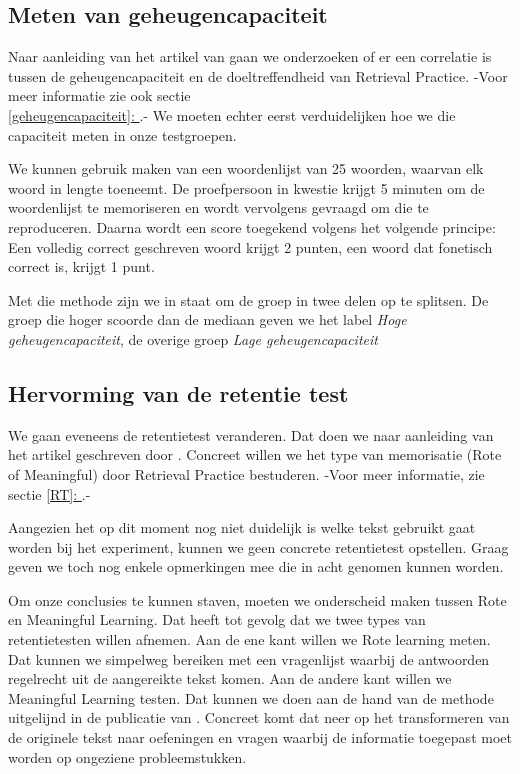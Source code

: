 \documentclass{hogent-article}
\newcommand{\customref}[1]{\underline{\ref{#1}: \nameref{#1}}}
\begin{document}
\subsection{Meten van geheugencapaciteit}
\label{methodology-gc}
Naar aanleiding van het artikel van \textcite{Agarwal_2016} gaan we onderzoeken of er een correlatie is tussen de geheugencapaciteit en de doeltreffendheid van Retrieval Practice. -Voor meer informatie zie ook sectie \\\customref{geheugencapaciteit}.- We moeten echter eerst verduidelijken hoe we die capaciteit meten in onze testgroepen.\\
\par
\noindent
We kunnen gebruik maken van een woordenlijst van 25 woorden, waarvan elk woord in lengte toeneemt. De proefpersoon in kwestie krijgt 5 minuten om de woordenlijst te memoriseren en wordt vervolgens gevraagd om die te reproduceren. Daarna wordt een score toegekend volgens het volgende principe: Een volledig correct geschreven woord krijgt 2 punten, een woord dat fonetisch correct is, krijgt 1 punt.\\
\par
\noindent
Met die methode zijn we in staat om de groep in twee delen op te splitsen. De groep die hoger scoorde dan de mediaan geven we het label \textit{Hoge geheugencapaciteit}, de overige groep  \textit{Lage geheugencapaciteit}

\subsection{Hervorming van de retentie test}
We gaan eveneens de retentietest veranderen. Dat doen we naar aanleiding van het artikel geschreven door \textcite{van_Gog_2012}. Concreet willen we het type van memorisatie (Rote of Meaningful) door Retrieval Practice  bestuderen. -Voor meer informatie, zie sectie \customref{RT}.-\\
\par
\noindent
Aangezien het op dit moment nog niet duidelijk is welke tekst gebruikt gaat worden bij het experiment, kunnen we geen concrete retentietest opstellen. Graag geven we toch nog enkele opmerkingen mee die in acht genomen kunnen worden.\\
\par
\noindent
Om onze conclusies te kunnen staven, moeten we onderscheid maken tussen Rote en Meaningful Learning. Dat heeft tot gevolg dat we twee types van retentietesten willen afnemen. Aan de ene kant willen we Rote learning meten. Dat kunnen we simpelweg bereiken met een vragenlijst waarbij de antwoorden regelrecht uit de aangereikte tekst komen. Aan de andere kant willen we Meaningful Learning testen. Dat kunnen we doen aan de hand van de methode uitgelijnd in de publicatie van \textcite{Mayer_2002}. Concreet komt dat neer op het transformeren van de originele tekst naar oefeningen en vragen waarbij de informatie toegepast moet worden op ongeziene probleemstukken.
\newpage
\end{document}
